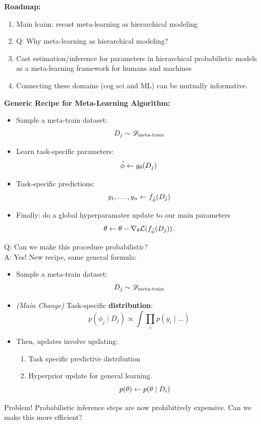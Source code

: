 {\bf Roadmap:}
\begin{enumerate}
    \item Main lcaim: recast meta-learning as hierarchical modeling
    \item Q: Why meta-learning as hierarchical modeling?
    \item Cast estimation/inference for parameters in hierarchical probabilistic models as a meta-learning framework for humans and machines
    \item Connecting these domains (cog sci and ML) can be mutually informative.
\end{enumerate}

{\bf Generic Recipe for Meta-Learning Algorithm:}
\begin{itemize}
    \item Sample a meta-train dataset:
    \[
    D_j \sim \mathscr{D}_{\text{meta-train}}
    \]
    \item Learn task-specific parameters:
    \[
    \hat{\phi} \leftarrow g_\theta(D_j)
    \]
    \item Task-specific predictions:
    \[
    y_1, \ldots, y_n \leftarrow f_{\hat{\phi}}(D_j)
    \]
    \item Finally: do a global hyperparamater update to our main parameters
    \[
    \theta \leftarrow \theta - \nabla_\theta \mathcal{L}(f_{\hat{\phi}}(D_j)).
    \]
\end{itemize}

Q: Can we make this procedure probabilistic? \\

A: Yes! New recipe, same general formula:
\begin{itemize}
    \item Sample a meta-train dataset:
    \[
    D_j \sim \mathscr{D}_{\text{meta-train}}
    \]
    \item {\it(Main Change)} Task-specific {\bf distribution}:
    \[
     p(\phi_j \mid D_j) \propto \int \prod_i p(y_i \mid \ldots )
    \]
    \item Then, updates involve updating:
    \begin{enumerate}
        \item Task specific predictive distribution
        \item Hyperprior update for general learning.
        \[
        p(\theta) \leftarrow p(\theta \mid D_i)
        \]
    \end{enumerate}
\end{itemize}

Problem! Probabilistic inference steps are now prohibitively expensive. Can we make this more efficient? \\

